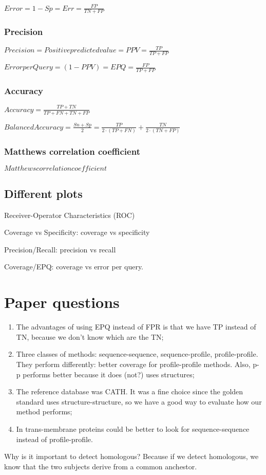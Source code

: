 $Error = 1 - Sp = Err = \frac{FP}{TN + FP}$

\subsubsection{Precision}

$Precision = Positive predicted value = PPV = \frac{TP}{TP + FP}$

$Error per Query = (1-PPV) = EPQ = \frac{FP}{TP + FP}$

\subsubsection{Accuracy}

$Accuracy = \frac{TP + TN}{TP + FN + TN + FP}$

$Balanced Accuracy = \frac{Sn + Sp}{2} = \frac{TP}{2 \cdot (TP + FN)} +
\frac{TN}{2 \cdot (TN + FP)}$

\subsubsection{Matthews correlation coefficient}

$Matthews correlation coefficient$

\subsection{Different plots}

Receiver-Operator Characteristics (ROC)

Coverage vs Specificity: coverage vs specificity

Precision/Recall: precision vs recall

Coverage/EPQ: coverage vs error per query.

\section{Paper questions}

\begin{enumerate}
\item The advantages of using EPQ instead of FPR is that we have TP instead of
TN, because we don't know which are the TN;
\item Three classes of methods: sequence-sequence, sequence-profile,
profile-profile. They perform differently: better coverage for profile-profile
methods. Also, p-p performs better because it does (not?) uses structures;
\item The reference database was CATH. It was a fine choice since the golden
standard uses structure-structure, so we have a good way to evaluate how our
method performs;
\item In trans-membrane proteins could be better to look for sequence-sequence
instead of profile-profile.
\end{enumerate}

Why is it important to detect homologous? Because if we detect homologous, we
know that the two subjects derive from a common anchestor.
